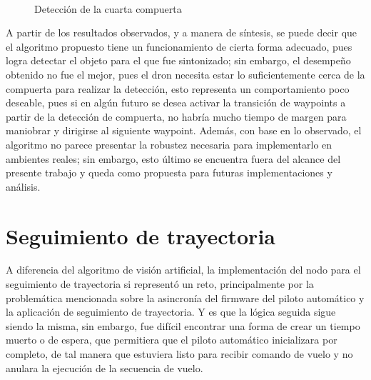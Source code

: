 \begin{figure}[ht]
    \centering
     \hspace{0.2 pt}
     \hspace{0.2 pt}
     \hspace{0.2 pt}
     \\
     \hspace{0.2 pt}
     \hspace{0.2 pt}
     \hspace{0.2 pt}
    
    \caption{Detección de la cuarta compuerta}
    \label{fig:ROS_gate4}
\end{figure}

A partir de los resultados observados, y a manera de síntesis, se puede decir que el algoritmo propuesto tiene un funcionamiento de cierta forma adecuado, pues logra detectar el objeto para el que fue sintonizado; sin embargo, el desempeño obtenido no fue el mejor, pues el dron necesita estar lo suficientemente cerca de la compuerta para realizar la detección, esto representa un comportamiento poco deseable, pues si en algún futuro se desea activar la transición de waypoints a partir de la detección de compuerta, no habría mucho tiempo de margen para maniobrar y dirigirse al siguiente waypoint. Además, con base en lo observado, el algoritmo no parece presentar la robustez necesaria para implementarlo en ambientes reales; sin embargo, esto último se encuentra fuera del alcance del presente trabajo y queda como propuesta para futuras implementaciones y análisis.


\section{Seguimiento de trayectoria}
A diferencia del algoritmo de visión artificial, la implementación del nodo para el seguimiento de trayectoria si representó un reto, principalmente por la problemática mencionada sobre la asincronía del firmware del piloto automático y la aplicación de seguimiento de trayectoria. Y es que la lógica seguida sigue siendo la misma, sin embargo, fue difícil encontrar una forma de crear un tiempo muerto o de espera, que permitiera que el piloto automático inicializara por completo, de tal manera que estuviera listo para recibir comando de vuelo y no anulara la ejecución de la secuencia de vuelo. 

